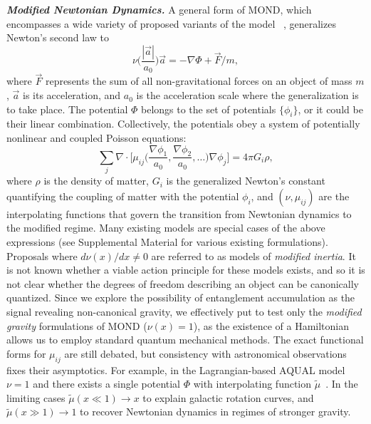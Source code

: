 \documentclass[aps,prd,reprint,superscriptaddress,nofootinbib,floatfix]{revtex4-2}
\begin{document}
\emph{\textbf{Modified Newtonian Dynamics.}}
A general form of MOND, which encompasses a wide variety of proposed variants of the model~\cite{MOND-Milgrom1992,Lag4MOND-Bekenstein1984,TeVeS-Bekenstein2004,MOND-QLinear-Milgrom2009,Milgrom:2023idw,MOND-General-Milgrom2023}
, generalizes Newton's second law to 
\begin{equation}
\nu\bigg(\frac{|\vec{a}|}{a_{0}}\bigg)\vec{a} = -\nabla\Phi + \vec{F}/m,
\label{eq:DiffMOND-1}
\end{equation}
where $\vec{F}$ represents the sum of all non-gravitational forces on an object of mass $m$, $\vec a$ is its acceleration, and $a_0$ is the acceleration scale where the generalization is to take place. The potential $\Phi$ belongs to the set of potentials $\{ \phi_{i} \}$, or it could be their linear combination.
Collectively, the potentials obey a system of potentially nonlinear and coupled Poisson equations:
\begin{equation}
\sum_{j}\nabla \cdot\bigg[\mu_{ij}\bigg(\frac{{\nabla}\phi_{1}}{a_{0}}, \frac{{\nabla}\phi_{2}}{a_{0}}, \dots \bigg) \nabla \phi_{j}\bigg] = 4\pi G_{i} \rho,
\label{eq:DiffMOND-2}
\end{equation}
where $\rho$ is the density of matter, $G_{i}$ is the generalized Newton's constant quantifying the coupling of matter with the potential $\phi_{i}$, and 
$(\nu,\mu_{ij})$ are the interpolating functions that govern the transition from Newtonian dynamics to the modified regime. Many existing models are special cases of the above expressions (see Supplemental Material for various existing formulations). 
Proposals where $d\nu(x)/dx \neq 0$ are referred to as models of \emph{modified inertia}.
It is not known whether a viable action principle for these models exists, and so it is not clear whether the degrees of freedom describing an object can be canonically quantized.
Since we explore the possibility of entanglement accumulation as the signal revealing non-canonical gravity, we effectively put to test only the \emph{modified gravity} formulations of MOND ($\nu(x)=1$), as the existence of a Hamiltonian allows us to employ standard quantum mechanical methods. The exact functional forms for $\mu_{ij}$ are still debated, but consistency with astronomical observations fixes their asymptotics.
For example, in the Lagrangian-based AQUAL model $\nu=1$ and there exists a single potential $\Phi$ with interpolating function $\tilde{\mu}$~\cite{Lag4MOND-Bekenstein1984}. 
In the limiting cases $\tilde \mu(x\ll 1) \to x$ to explain galactic rotation curves, and $ \tilde \mu(x\gg 1) \to 1$ to recover Newtonian dynamics in regimes of stronger gravity.
\end{document}
